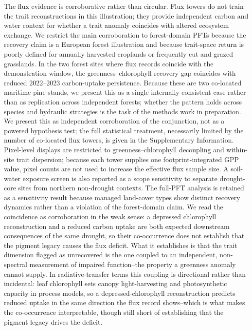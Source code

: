 \documentclass[pdflatex,sn-mathphys-num]{sn-jnl}
\begin{document}
The flux evidence is corroborative rather than circular. Flux towers do not train the trait reconstructions in this illustration; they provide independent carbon and water context for whether a trait anomaly coincides with altered ecosystem exchange. We restrict the main corroboration to forest-domain PFTs because the recovery claim is a European forest illustration and because trait-space return is poorly defined for annually harvested croplands or frequently cut and grazed grasslands. In the two forest sites where flux records coincide with the demonstration window, the greenness--chlorophyll recovery gap coincides with reduced 2022--2023 carbon-uptake persistence. Because these are two co-located maritime-pine stands, we present this as a single internally consistent case rather than as replication across independent forests; whether the pattern holds across species and hydraulic strategies is the task of the methods work in preparation. We present this as independent corroboration of the conjunction, not as a powered hypothesis test; the full statistical treatment, necessarily limited by the number of co-located flux towers, is given in the Supplementary Information. Pixel-level displays are restricted to greenness--chlorophyll decoupling and within-site trait dispersion; because each tower supplies one footprint-integrated GPP value, pixel counts are not used to increase the effective flux sample size. A soil-water exposure screen is also reported as a scope sensitivity to separate drought-core sites from northern non-drought contexts. The full-PFT analysis is retained as a sensitivity result because managed land-cover types show distinct recovery dynamics rather than a violation of the forest-domain claim. We read the coincidence as corroboration in the weak sense: a depressed chlorophyll reconstruction and a reduced carbon uptake are both expected downstream consequences of the same drought, so their co-occurrence does not establish that the pigment legacy causes the flux deficit. What it establishes is that the trait dimension flagged as unrecovered is the one coupled to an independent, non-spectral measurement of impaired function--the property a greenness anomaly cannot supply. In radiative-transfer terms this coupling is directional rather than incidental: leaf chlorophyll sets canopy light-harvesting and photosynthetic capacity in process models, so a depressed-chlorophyll reconstruction predicts reduced uptake in the same direction the flux record shows--which is what makes the co-occurrence interpretable, though still short of establishing that the pigment legacy drives the deficit.
\end{document}
